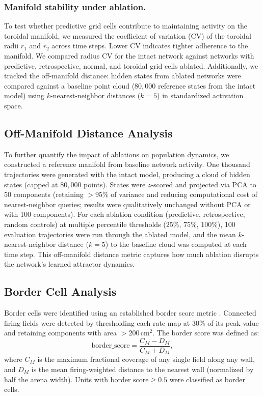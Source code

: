 \documentclass[11pt]{article}
\begin{document}
\subsubsection*{Manifold stability under ablation.}
To test whether predictive grid cells contribute to maintaining activity on the toroidal manifold, we measured the coefficient of variation (CV) of the toroidal radii $r_1$ and $r_2$ across time steps. Lower CV indicates tighter adherence to the manifold. We compared radius CV for the intact network against networks with predictive, retrospective, normal, and toroidal grid cells ablated. Additionally, we tracked the off-manifold distance: hidden states from ablated networks were compared against a baseline point cloud ($80{,}000$ reference states from the intact model) using $k$-nearest-neighbor distances ($k = 5$) in standardized activation space.


\subsection*{Off-Manifold Distance Analysis}

To further quantify the impact of ablations on population dynamics, we constructed a reference manifold from baseline network activity. One thousand trajectories were generated with the intact model, producing a cloud of hidden states (capped at $80{,}000$ points). States were $z$-scored and projected via PCA to 50 components (retaining $>95\%$ of variance and reducing computational cost of nearest-neighbor queries; results were qualitatively unchanged without PCA or with 100 components). For each ablation condition (predictive, retrospective, random controls) at multiple percentile thresholds (25\%, 75\%, 100\%), 100 evaluation trajectories were run through the ablated model, and the mean $k$-nearest-neighbor distance ($k = 5$) to the baseline cloud was computed at each time step. This off-manifold distance metric captures how much ablation disrupts the network's learned attractor dynamics.


\subsection*{Border Cell Analysis}

Border cells were identified using an established border score metric \cite{solstad2008}. Connected firing fields were detected by thresholding each rate map at 30\% of its peak value and retaining components with area $> 200$\,cm$^2$. The border score was defined as:
\begin{equation}
    \mathrm{border\_score} = \frac{C_M - D_M}{C_M + D_M},
\end{equation}
where $C_M$ is the maximum fractional coverage of any single field along any wall, and $D_M$ is the mean firing-weighted distance to the nearest wall (normalized by half the arena width). Units with $\mathrm{border\_score} \ge 0.5$ were classified as border cells.
\end{document}

